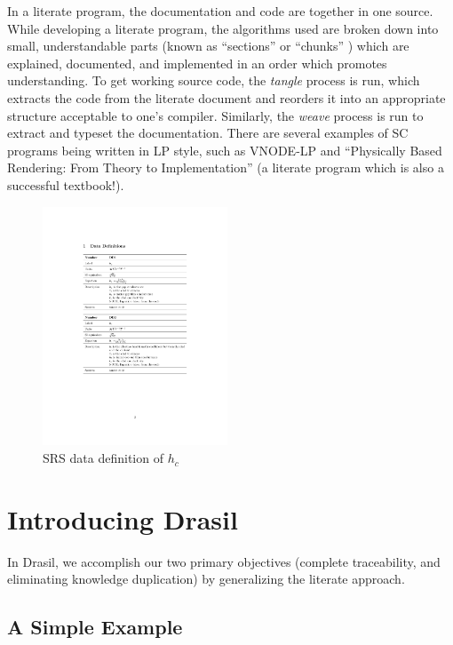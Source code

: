 \documentclass{sig-alternate-05-2015}
\newcommand{\lss}{Drasil}
\begin{document}
In a literate program, the documentation and code are together in one source.
While developing a literate program, the algorithms used are broken down into
small, understandable parts (known as ``sections'' \cite{Knuth1984} or
``chunks'' \cite{JohnsonAndJohnson1997}) which are explained, documented, and
implemented in an order which promotes understanding. To get working source
code, the \textit{tangle} process is run, which extracts the code from the
literate document and reorders it into an appropriate structure acceptable
to one's compiler.  Similarly, the \textit{weave} process is run to extract and
typeset the documentation.
There are several examples of SC programs being written in LP style, such as
VNODE-LP \cite{Nedialkov2006} and ``Physically Based Rendering: From Theory to
Implementation'' \cite{PharrAndHumphreys2004} (a literate program which is also
a successful textbook!).

\begin{figure}
\includegraphics[width=0.49\textwidth]{h_c.pdf}
\caption{SRS data definition of $h_c$}
\label{fig:h_c}
\end{figure}	

\section{Introducing \lss} \label{sec:lss}

In \lss, we accomplish our two primary objectives (complete traceability, and
eliminating knowledge duplication) by generalizing the literate approach.

\subsection{A Simple Example} \label{ssec:example}
\end{document}
